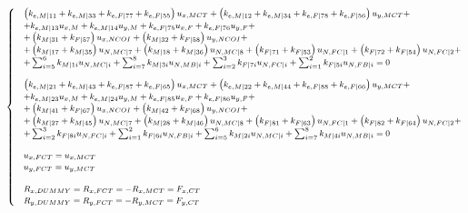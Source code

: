 \documentclass[a4paper]{jpconf}
\begin{document}
\begin{equation}
\footnotesize
\begin{cases}
&\left(k_{e,M|11}+k_{e,M|33}+k_{e,F|77}+k_{e,F|55}\right)u_{x,MCT}+\left(k_{e,M|12}+k_{e,M|34}+k_{e,F|78}+k_{e,F|56}\right)u_{y,MCT}+\\&+k_{e,M|13}u_{x,M}+k_{e,M|14}u_{y,M}+k_{e,F|75}u_{x,F}+k_{e,F|76}u_{y,F}+\\&+\left(k_{M|31}+k_{F|57}\right)u_{x,NCOI}+\left(k_{M|32}+k_{F|58}\right)u_{y,NCOI}+\\&+\left(k_{M|17}+k_{M|35}\right)u_{N,MC|7}+\left(k_{M|18}+k_{M|36}\right)u_{N,MC|8}+\left(k_{F|71}+k_{F|53}\right)u_{N,FC|1}+\left(k_{F|72}+k_{F|54}\right)u_{N,FC|2}+\\&+\sum_{i=5}^{6}k_{M|1i}u_{N,MC|i}+\sum_{i=7}^{8}k_{M|3i}u_{N,MB|i}+\sum_{i=2}^{3}k_{F|7i}u_{N,FC|i}+\sum_{i=1}^{2}k_{F|5i}u_{N,FB|i}=0\\[10pt]
&\left(k_{e,M|21}+k_{e,M|43}+k_{e,F|87}+k_{e,F|65}\right)u_{x,MCT}+\left(k_{e,M|22}+k_{e,M|44}+k_{e,F|88}+k_{e,F|66}\right)u_{y,MCT}+\\&+k_{e,M|23}u_{x,M}+k_{e,M|24}u_{y,M}+k_{e,F|85}u_{x,F}+k_{e,F|86}u_{y,F}+\\&+\left(k_{M|41}+k_{F|67}\right)u_{x,NCOI}+\left(k_{M|42}+k_{F|68}\right)u_{y,NCOI}+\\&+\left(k_{M|27}+k_{M|45}\right)u_{N,MC|7}+\left(k_{M|28}+k_{M|46}\right)u_{N,MC|8}+\left(k_{F|81}+k_{F|63}\right)u_{N,FC|1}+\left(k_{F|82}+k_{F|64}\right)u_{N,FC|2}+\\&+\sum_{i=2}^{3}k_{F|8i}u_{N,FC|i}+\sum_{i=1}^{2}k_{F|6i}u_{N,FB|i}+\sum_{i=5}^{6}k_{M|2i}u_{N,MC|i}+\sum_{i=7}^{8}k_{M|4i}u_{N,MB|i}=0\\[10pt]
&u_{x,FCT}=u_{x,MCT}\\
&u_{y,FCT}=u_{y,MCT}\\[10pt]
&R_{x,DUMMY}=R_{x,FCT}=-R_{x,MCT}=F_{x,CT}\\
&R_{y,DUMMY}=R_{y,FCT}=-R_{y,MCT}=F_{y,CT}\\
\end{cases}
\end{equation}
\end{document}
